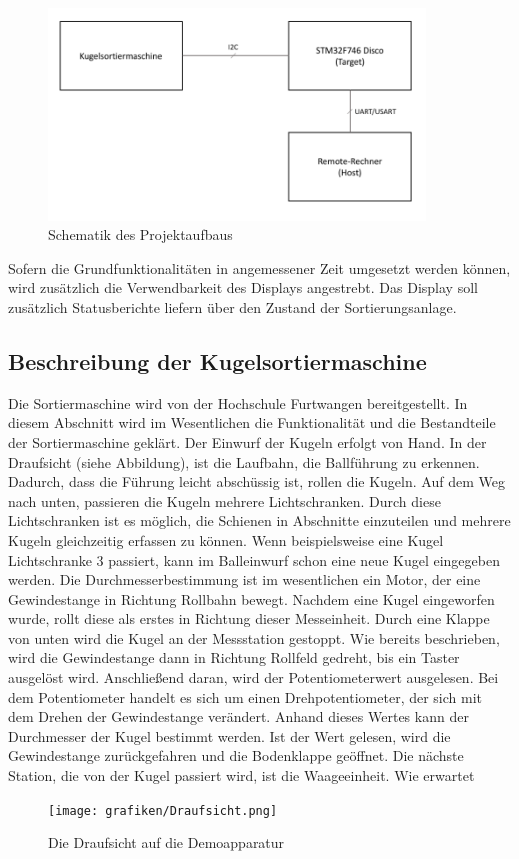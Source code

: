 \documentclass[12pt,a4paper]{article}
\begin{document}
\begin{figure}[h]
\begin{center}
\includegraphics[width=10cm]{grafiken/Schematik.png}
\caption{Schematik des Projektaufbaus}
\label{schematik_projektaufbau}
\end{center}
\end{figure}
Sofern die Grundfunktionalitäten in angemessener Zeit umgesetzt werden können, wird zusätzlich die Verwendbarkeit des Displays angestrebt. Das Display soll zusätzlich Statusberichte liefern über den Zustand der Sortierungsanlage. 
\subsection{Beschreibung der Kugelsortiermaschine}
Die Sortiermaschine wird von der Hochschule Furtwangen bereitgestellt. In diesem Abschnitt wird im Wesentlichen die Funktionalität und die Bestandteile der Sortiermaschine geklärt.
Der Einwurf der Kugeln erfolgt von Hand. In der Draufsicht (siehe Abbildung), ist die Laufbahn, die Ballführung zu erkennen. Dadurch, dass die Führung leicht abschüssig ist, rollen die Kugeln. Auf dem Weg nach unten, passieren die Kugeln mehrere Lichtschranken. Durch diese Lichtschranken ist es möglich, die Schienen in Abschnitte einzuteilen und mehrere Kugeln gleichzeitig erfassen zu können. Wenn beispielsweise eine Kugel Lichtschranke 3 passiert, kann im Balleinwurf schon eine neue Kugel eingegeben werden. Die Durchmesserbestimmung ist im wesentlichen ein Motor, der eine Gewindestange in Richtung Rollbahn bewegt. Nachdem eine Kugel eingeworfen wurde, rollt diese als erstes in Richtung dieser Messeinheit. Durch eine Klappe von unten wird die Kugel an der Messstation gestoppt. Wie bereits beschrieben, wird die Gewindestange dann in Richtung Rollfeld gedreht, bis ein Taster ausgelöst wird. Anschließend daran, wird der Potentiometerwert ausgelesen. Bei dem Potentiometer handelt es sich um einen Drehpotentiometer, der sich mit dem Drehen der Gewindestange verändert. Anhand dieses Wertes kann der Durchmesser der Kugel bestimmt werden. Ist der Wert gelesen, wird die Gewindestange zurückgefahren und die Bodenklappe geöffnet. Die nächste Station, die von der Kugel passiert wird, ist die Waageeinheit. Wie erwartet 
\begin{figure}[ht]
\begin{center}
\texttt{[image: grafiken/Draufsicht.png]}
\caption{Die Draufsicht auf die Demoapparatur}
\label{draufsicht_sortiermaschine}
\end{center}
\end{figure}
\end{document}
